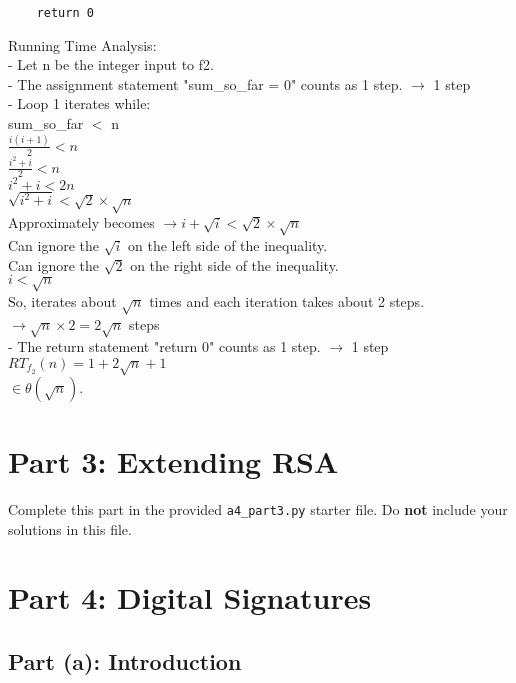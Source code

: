 \documentclass[11pt]{article}
\begin{document}
\begin{enumerate}
\begin{verbatim}
    return 0
\end{verbatim}
Running Time Analysis: \\
- Let n be the integer input to f2. \\
- The assignment statement "sum\_so\_far = 0" counts as 1 step. $\rightarrow$ 1 step \\
- Loop 1 iterates while: \\
sum\_so\_far $<$ n \\
$\frac{i(i + 1)}{2} < n$ \\
$\frac{i^2 + i}{2} < n$ \\
$i^2 + i < 2n$ \\
$\sqrt{i^2 + i} < \sqrt{2} \times \sqrt{n}$ \\
Approximately becomes $\rightarrow i + \sqrt{i} < \sqrt{2} \times \sqrt{n}$ \\
Can ignore the $\sqrt{i}$ on the left side of the inequality. \\
Can ignore the $\sqrt{2}$ on the right side of the inequality. \\
$i < \sqrt{n}$ \\
So, iterates about $\sqrt{n}$ times and each iteration takes about 2 steps. $\rightarrow \sqrt{n} \times 2 = 2\sqrt{n}$ steps \\
- The return statement "return 0" counts as 1 step. $\rightarrow$ 1 step \\
$RT_f_2(n) = 1 + 2\sqrt{n} + 1$ \\
$\in \theta (\sqrt{n}).$



\end{enumerate}

\newpage

\section*{Part 3: Extending RSA}

Complete this part in the provided \texttt{a4\_part3.py} starter file.
Do \textbf{not} include your solutions in this file.

\section*{Part 4: Digital Signatures}

\subsection*{Part (a): Introduction}
\end{document}
